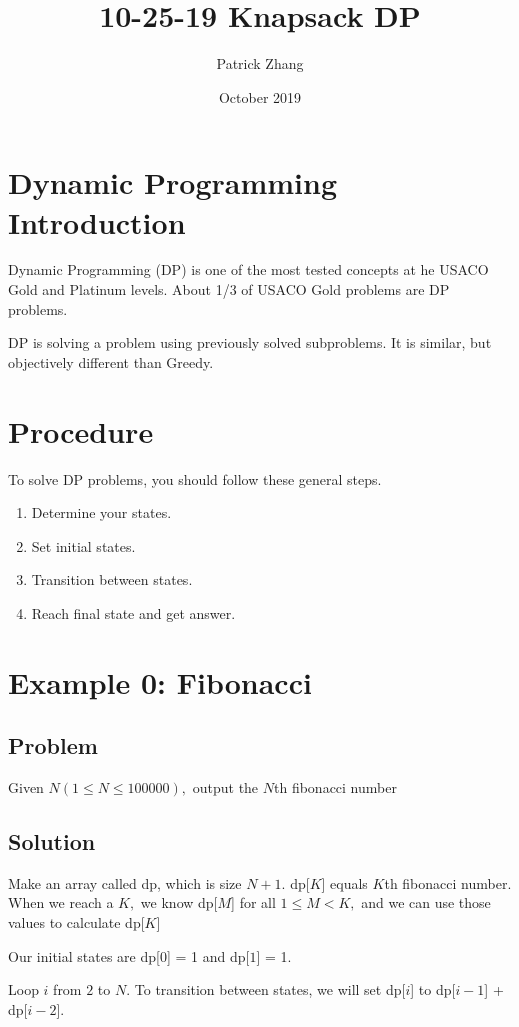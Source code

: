 \documentclass{article}
\title{10-25-19 Knapsack DP}
\author{Patrick Zhang}
\date{October 2019}
\begin{document}
\maketitle
\section{Dynamic Programming Introduction}
Dynamic Programming (DP) is one of the most tested concepts at he USACO Gold and Platinum levels. About 1/3 of USACO Gold problems are DP problems. 

DP is solving a problem using previously solved subproblems. It is similar, but objectively different than Greedy.

\section{Procedure}
To solve DP problems, you should follow these general steps. 

\begin{enumerate}
    \item Determine your states.
    \item Set initial states.
    \item Transition between states.
    \item Reach final state and get answer.
\end{enumerate}

\section{Example 0: Fibonacci}
\subsection{Problem}
Given $N (1 \leq N \leq 100000),$ output the $N$th fibonacci number

\subsection{Solution}
Make an array called dp, which is size $N+1.$ dp[$K$] equals $K$th fibonacci number. When we reach a $K,$ we know dp[$M$] for all $1 \leq M < K,$ and we can use those values to calculate dp[$K$] 

Our initial states are dp[$0$] = 1 and dp[$1$] = 1.

Loop $i$ from $2$ to $N.$ To transition between states, we will set dp[$i$] to dp[$i-1$] + dp[$i-2$]. 
\end{document}
